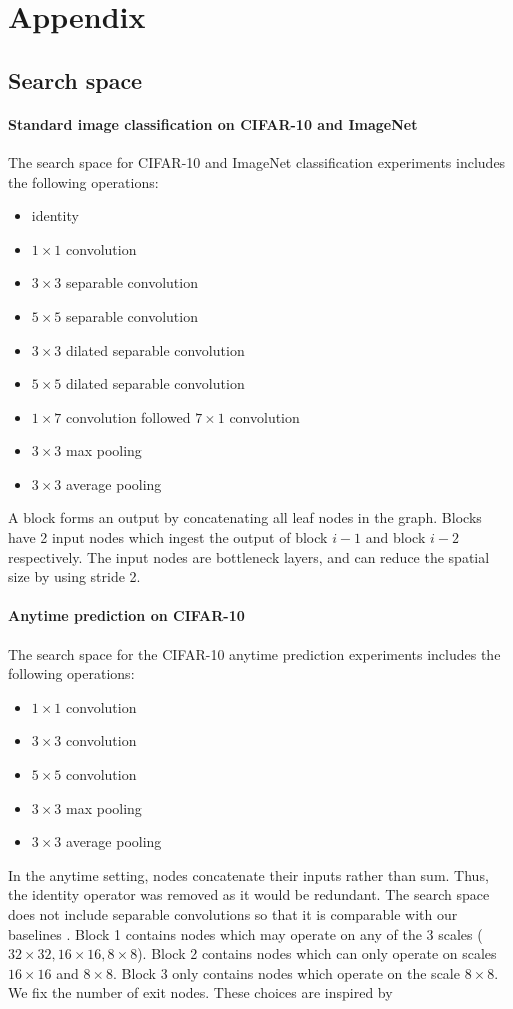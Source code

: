 \section{Appendix}
\subsection{Search space}
\paragraph{Standard image classification on CIFAR-10 and ImageNet}
The search space for CIFAR-10 and ImageNet classification experiments includes the following operations:
\begin{itemize}
\item identity
\item $1\times1$ convolution
\item $3\times3$ separable convolution
\item $5\times5$ separable convolution
\item $3\times3$ dilated separable convolution
\item $5\times5$ dilated separable convolution
\item $1\times7$ convolution followed $7\times1$ convolution
\item $3\times3$ max pooling
\item $3\times3$ average pooling
\end{itemize}
A block forms an output by concatenating all leaf nodes in the graph. Blocks have 2 input nodes which ingest the output of block $i-1$ and block $i-2$ respectively. The input nodes are bottleneck layers, and can reduce the spatial size by using stride 2. 

\paragraph{Anytime prediction on CIFAR-10}
The search space for the CIFAR-10 anytime prediction experiments includes the following operations:
\begin{itemize}
\item $1\times1$ convolution
\item $3\times3$  convolution
\item $5\times5$  convolution
\item $3\times3$ max pooling
\item $3\times3$ average pooling
\end{itemize}
In the anytime setting, nodes concatenate their inputs rather than sum. Thus, the identity operator was removed as it would be redundant. The search space does not include separable convolutions so that it is comparable with our baselines \citep{huang2017multi}. Block 1 contains nodes which may operate on any of the 3 scales ($32\times32, 16\times16, 8\times8$). Block 2 contains nodes which can only operate on scales $16\times16$ and $8\times 8$. Block 3 only contains nodes which operate on the scale $8\times 8$. We fix the number of exit nodes. These choices are inspired by  \cite{huang2017multi}

